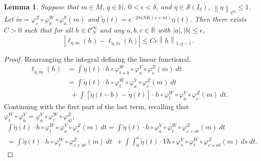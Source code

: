 \documentclass[10pt,a4paper]{amsart}
\newtheorem{lemma}{Lemma}
\newcommand{\abs}[1]{\left|#1\right|} %
\newcommand{\bN}{\mathbb{N}} %
\newcommand{\bR}{\mathbb{R}} %
\newcommand{\cC}{\mathcal{C}} %
\newcommand{\cS}{\mathcal{S}} %
\newcommand{\dv}{V} %
\newcommand{\dw}{W} %
\newcommand{\dz}{Z} %
\newcommand{\norm}[1]{\left\|#1\right\|} %
\begin{document}
\begin{lemma}
    \label{lem:slide}
    Suppose that \(m \in M\), \(q\in\bN\), \(0<\epsilon<\delta\), and \(\eta \in \cS(I_{\delta})\), \(\norm{\eta}_{\cC^q} \leq 1\).
    Let \(\tilde{m} = \varphi_c^\dz \circ \varphi_b^\dw \circ \varphi_a^\dv (m)\) and \(\tilde{\eta}(t) = e^{- 2\pi i NK (c + at)} \eta(t)\).
    Then there exists \(C>0\) such that for all \(h \in  \cC^\infty_N\) and any \(a,b,c \in \bR\) with \(\abs{a}, \abs{b} \leq \epsilon\), %
    \[
        \abs{\ell_{\eta,m}(h) - \ell_{\tilde{\eta},\tilde{m}}(h)} \leq C \epsilon \norm{h}_{1,q-1}.
    \]
\end{lemma}

\begin{proof}
    Rearranging the integral defining the linear functional,
    \begin{equation}
        \label{eq:slide1}
        \begin{aligned}
            \ell_{\tilde{\eta},\tilde{m}}(h)
             & = \int \tilde{\eta}(t) \cdot h \circ \varphi_{t+b}^{\dw} \circ \varphi_a^\dv \circ \varphi_c^\dz (m) \ dt                                     \\
             & = \int \tilde{\eta}(t) \cdot h \circ \varphi_{t}^{\dw} \circ \varphi_a^\dv \circ \varphi_c^\dz (m) \ dt                                       \\
             & \ \ + \int \left[\tilde{\eta}(t-b) - \tilde{\eta}(t)\right] \cdot h \circ \varphi_{t}^{\dw} \circ \varphi_a^\dv \circ \varphi_c^\dz (m) \ dt.
        \end{aligned}
    \end{equation}
    Continuing with the first part of the last term, recalling that \(\varphi_{t}^{\dw} \circ \varphi_a^\dv = \varphi_a^\dv  \circ \varphi_{t}^{\dw} \circ \varphi_{at}^\dz\),
    \begin{multline}
        \label{eq:slide2}
            \int \tilde{\eta}(t) \cdot h \circ \varphi_{t}^{\dw} \circ \varphi_a^\dv \circ \varphi_c^\dz (m) \ dt
              = \int \tilde{\eta}(t) \cdot h \circ \varphi_a^\dv  \circ \varphi_{t}^{\dw} \circ \varphi_{c+at}^\dz (m) \ dt                               \\
             = \int \tilde{\eta}(t) \cdot h \circ \varphi_{t}^{\dw} \circ \varphi_{c+at}^\dz (m) \ dt                                                    
              \ \ + \int \int_{0}^{a} \tilde{\eta}(t) \cdot \dv h \circ \varphi_{s}^{\dv} \circ \varphi_{t}^{\dw} \circ \varphi_{c+at}^\dz (m) \ ds \ dt.
    \end{multline}

\end{proof}
\end{document}
